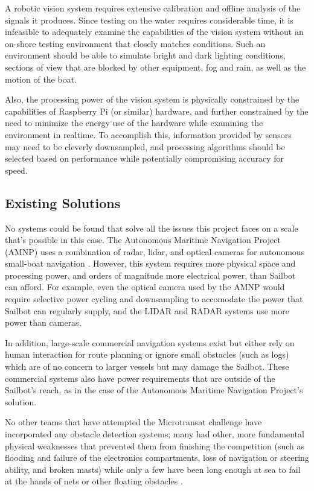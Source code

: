 A robotic vision system requires extensive calibration and offline analysis of the signals it produces. Since testing on the water requires considerable time, it is infeasible to adequately examine the capabilities of the vision system without an on-shore testing environment that closely matches conditions. Such an environment should be able to simulate bright and dark lighting conditions, sections of view that are blocked by other equipment, fog and rain, as well as the motion of the boat.

Also, the processing power of the vision system is physically constrained by the capabilities of Raspberry Pi (or similar) hardware, and further constrained by the need to minimize the energy use of the hardware while examining the environment in realtime. To accomplish this, information provided by sensors may need to be cleverly downsampled, and processing algorithms should be selected based on performance while potentially compromising accuracy for speed.


\subsection{\label{sec:intro:existing-solutions}Existing Solutions}
No systems could be found that solve all the issues this project faces on a scale that's possible in this case. The Autonomous Maritime Navigation Project (AMNP) uses a combination of radar, lidar, and optical cameras for autonomous small-boat navigation \cite{AMN}. However, this system requires more physical space and processing power, and orders of magnitude more electrical power, than Sailbot can afford. For example, even the optical camera used by the AMNP would require selective power cycling and downsampling to accomodate the power that Sailbot can regularly supply, and the LIDAR and RADAR systems use more power than cameras.

In addition, large-scale commercial navigation systems exist but either rely on human interaction for route planning or ignore small obstacles (such as logs) which are of no concern to larger vessels but may damage the Sailbot. These commercial systems also have power requirements that are outside of the Sailbot's reach, as in the case of the Autonomous Maritime Navigation Project's solution. 

No other teams that have attempted the Microtransat challenge have incorporated any obstacle detection systems; many had other, more fundamental physical weaknesses that prevented them from finishing the competition (such as flooding and failure of the electronics compartments, loss of navigation or steering ability, and broken masts) while only a few have been long enough at sea to fail at the hands of nets or other floating obstacles \cite{transat-history}.


